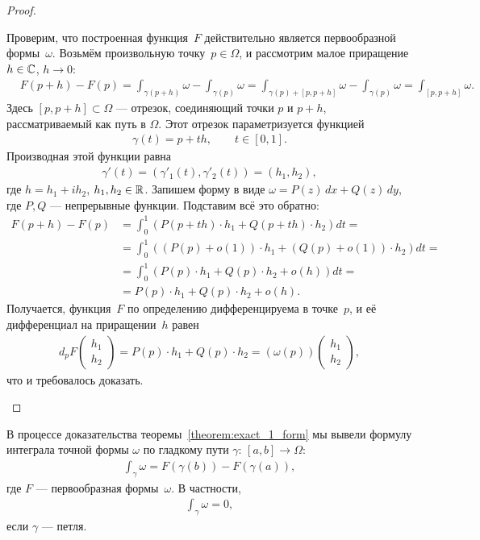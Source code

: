 \documentclass[../complex-analysis.tex]{subfiles}
\begin{document}
\begin{proof}
\begin{itemize}
   Проверим, что построенная функция~$F$ действительно является первообразной формы~$ \omega $. Возьмём произвольную точку~$p \in \Omega$, и рассмотрим малое приращение $h \in \mathbb{C}$, $h \to 0$:
   \begin{align*}
    &F(p + h) - F(p) = \int_{\gamma(p + h)}  \omega - \int_{\gamma(p)}  \omega = \int_{\gamma(p) + [p,p+h]} \omega - \int_{\gamma(p)}   \omega = \int_{[p,p+h]} \omega.
   \end{align*} Здесь $[p,p+h] \subset \Omega$ --- отрезок, соединяющий точки $p$ и $p + h$, рассматриваемый как путь в $\Omega$. Этот отрезок параметризуется функцией
   \begin{align*}
    \gamma(t) = p + th, \qquad t \in [0,1].
   \end{align*} Производная этой функции равна
   \begin{align*}
    \gamma'(t) = (\gamma'_1(t), \gamma'_2(t)) = (h_1, h_2),
   \end{align*} где $h = h_1 + i h_2$, $ h_1,h_2\in\mathbb{R} $. Запишем форму в виде $\omega = P(z)\,dx + Q(z)\,dy$, где $P,Q$ --- непрерывные функции. Подставим всё это обратно:
   \begin{align*}
    F(p+h)-F(p) &= \int_{0}^{1} \left( P(p+th) \cdot h_1 + Q(p+th)\cdot h_2 \right)dt = \\
    &=  \int_{0}^{1} \left( (P(p) + o(1))\cdot h_1 + (Q(p) + o(1))\cdot h_2 \right)dt = \\
    &= \int_{0}^{1} \left( P(p) \cdot h_1 + Q(p)\cdot h_2 + o(h) \right)dt = \\
    &= P(p) \cdot h_1 + Q(p)\cdot h_2 + o(h).
   \end{align*} Получается, функция~$F$ по определению дифференцируема в точке~$p$, и её дифференциал на приращении~$h$ равен
   \begin{align*}
    d_p F \begin{pmatrix}
     h_1 \\ h_2
     \end{pmatrix} = P(p)\cdot  h_1 + Q(p)\cdot h_2 = \left( \omega(p) \right) \begin{pmatrix}
     h_1 \\ h_2
    \end{pmatrix}
   ,\end{align*} что и требовалось доказать.
 \end{itemize}
\end{proof}

\begin{remrk}
 \label{remark:integral_of_exact_form}
 В процессе доказательства теоремы~\ref{theorem:exact_1_form} мы вывели формулу интеграла точной формы $ \omega $ по гладкому пути $ \gamma \colon\,[a,b] \to \Omega $:
 \begin{align}
  \label{eq:integral_of_exact_form}
  \int_{\gamma} \omega =  F(\gamma(b)) - F(\gamma(a)),
 \end{align} где $ F $ --- первообразная формы~$ \omega $. В частности,
 \begin{align*}
  \int_{\gamma} \omega = 0, 
 \end{align*} если $ \gamma $ --- петля.
\end{remrk}
\end{document}
